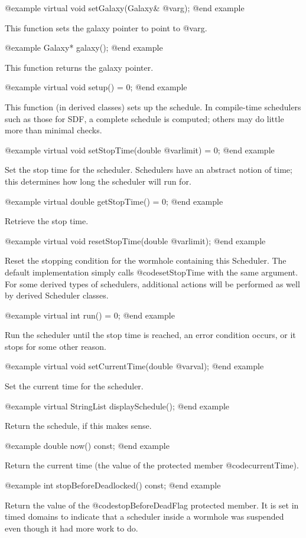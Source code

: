 @example
virtual void setGalaxy(Galaxy& @var{g});
@end example

This function sets the galaxy pointer to point to @var{g}.

@example
Galaxy* galaxy();
@end example

This function returns the galaxy pointer.

@example
virtual void setup() = 0;
@end example

This function (in derived classes) sets up the schedule.  In
compile-time schedulers such as those for SDF, a complete schedule is
computed; others may do little more than minimal checks.

@example
virtual void setStopTime(double @var{limit}) = 0;
@end example

Set the stop time for the scheduler.  Schedulers have an abstract
notion of time; this determines how long the scheduler will run for.

@example
virtual double getStopTime() = 0;
@end example

Retrieve the stop time.

@example
virtual void resetStopTime(double @var{limit});
@end example

Reset the stopping condition for the wormhole containing this Scheduler.
The default implementation simply calls @code{setStopTime} with
the same argument.  For some derived types of schedulers, additional
actions will be performed as well by derived Scheduler classes.

@example
virtual int run() = 0;
@end example

Run the scheduler until the stop time is reached, an error condition
occurs, or it stops for some other reason.

@example
virtual void setCurrentTime(double @var{val});
@end example

Set the current time for the scheduler.

@example
virtual StringList displaySchedule();
@end example

Return the schedule, if this makes sense.

@example
double now() const;
@end example

Return the current time (the value of the protected member
@code{currentTime}).

@example
int stopBeforeDeadlocked() const;
@end example

Return the value of the @code{stopBeforeDeadFlag} protected member.
It is set in timed domains to indicate that a scheduler inside a
wormhole was suspended even though it had more work to do.

